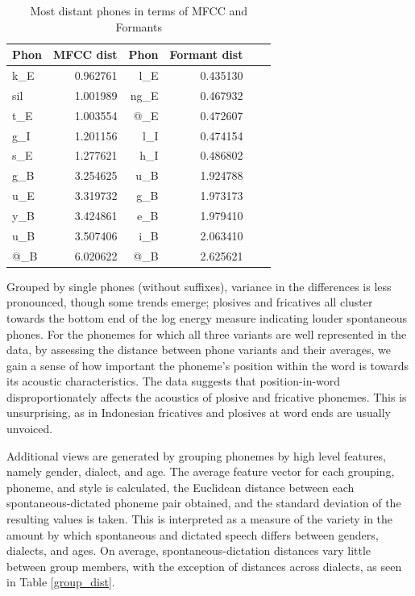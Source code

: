 \documentclass[conference]{IEEEtran}
\begin{document}
\begin{table}[!htb]
\renewcommand{\arraystretch}{1.3}
\caption{Most distant phones in terms of MFCC and Formants}
\label{mfc_frm}
\centering
\begin{tabular}{|l|r|r|r|r|r|}
    \hline
    Phon & MFCC dist & Phon & Formant dist \\
    \hline
    k\_E  &  0.962761 & l\_E  &  0.435130 \\
    sil   &  1.001989 & ng\_E &  0.467932 \\
    t\_E  &  1.003554 & @\_E  &  0.472607 \\
    g\_I  &  1.201156 & l\_I  &  0.474154 \\
    s\_E  &  1.277621 & h\_I  &  0.486802 \\
    \hline
    g\_B  &  3.254625 & u\_B  &  1.924788 \\
    u\_E  &  3.319732 & g\_B  &  1.973173 \\
    y\_B  &  3.424861 & e\_B  &  1.979410 \\
    u\_B  &  3.507406 & i\_B  &  2.063410 \\
    @\_B  &  6.020622 & @\_B  &  2.625621 \\
    \hline
\end{tabular}
\end{table}

Grouped by single phones (without suffixes), variance in the differences is less pronounced, though some trends emerge; plosives and fricatives all cluster towards the bottom end of the log energy measure indicating louder spontaneous phones.
For the phonemes for which all three variants are well represented in the data, by assessing the distance between phone variants and their averages, we gain a sense of how important the phoneme's position within the word is towards its acoustic characteristics.
The data suggests that position-in-word disproportionately affects the acoustics of plosive and fricative phonemes.
This is unsurprising, as in Indonesian fricatives and plosives at word ends are usually unvoiced.

Additional views are generated by grouping phonemes by high level features, namely gender, dialect, and age.
The average feature vector for each grouping, phoneme, and style is calculated, the Euclidean distance between each spontaneous-dictated phoneme pair obtained, and the standard deviation of the resulting values is taken.
This is interpreted as a measure of the variety in the amount by which spontaneous and dictated speech differs between genders, dialects, and ages.
On average, spontaneous-dictation distances vary little between group members, with the exception of distances across dialects, as seen in Table \ref{group_dist}.
\end{document}
